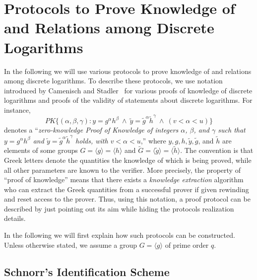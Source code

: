 \section{Protocols to Prove Knowledge of and Relations among Discrete Logarithms}
\label{app:zkprotocols}

In the following we will use various protocols to prove knowledge of and relations 
among discrete logarithms.
To describe these protocols, we use  notation introduced by Camenisch and
Stadler~\cite{camsta97b} for various proofs of knowledge of discrete
logarithms and proofs of the validity of statements about discrete logarithms.
For instance,
\[\textit{PK}
\{ (\alpha,\beta,\gamma): y = g^\alpha h^\beta \ \wedge \ \tilde{y} =
\tilde{g}^\alpha \tilde{h}^\gamma \ \wedge \ ( v < \alpha < u) \}
\]
denotes a ``\textit{zero-knowledge \emph{P}roof of \emph{K}nowledge of
  integers $\alpha$, $\beta$, and $\gamma$ such that $y = g^\alpha h^\beta$
  and $\tilde{y} = \tilde{g}^\alpha \tilde{h}^\gamma$ holds, with $ v <
  \alpha < u$},'' where $y,g,h,\tilde{y},\tilde{g}$, and $\tilde{h}$ are
elements of some groups $G = \langle g\rangle = \langle h\rangle$ and
$\tilde{G} = \langle \tilde{g}\rangle = \langle \tilde{h} \rangle$.  
The
convention is that Greek letters denote the quantities the knowledge of which is
being proved, while all other parameters are known to the verifier. 
More precisely, the property of ``proof of knowledge'' means that there exists a
\emph{knowledge extraction} 
algorithm who can 
extract the Greek quantities from a successful prover if given rewinding and
reset access to the prover.
Thus, using this
notation, a proof protocol can be described by just pointing out its aim while
hiding the protocols realization details.


In the following we will first explain how such protocols can be constructed.
Unless otherwise stated, we assume a group $G = \langle g \rangle$ of prime order
$q$.

\subsection{Schnorr's Identification Scheme}
\label{Schnorr's Identification Scheme}

